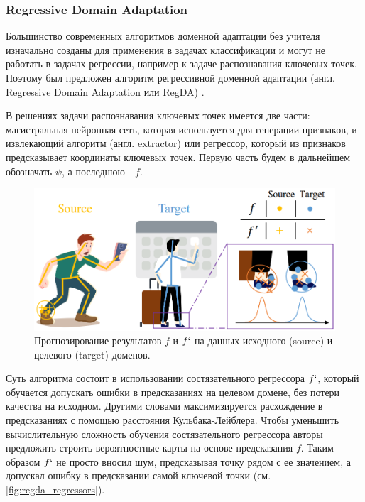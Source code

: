 \subsubsection*{Regressive Domain Adaptation}

Большинство современных алгоритмов доменной адаптации без учителя изначально созданы для применения в задачах классификации и могут не работать в задачах регрессии, например к задаче распознавания ключевых точек. Поэтому был предложен алгоритм регрессивной доменной адаптации (англ. Regressive Domain Adaptation или RegDA) \cite{regda}.

В решениях задачи распознавания ключевых точек имеется две части: магистральная нейронная сеть, которая используется для генерации признаков, и извлекающий алгоритм (англ. extractor) или регрессор, который из признаков предсказывает координаты ключевых точек. Первую часть будем в дальнейшем обозначать $\psi$, а последнюю - $f$.

\begin{figure}[h]
	\centering
	\includegraphics[width=.8\textwidth]{./images/regda_regressors}
	\caption{Прогнозирование результатов $f$ и $f`$ на данных исходного (source) и целевого (target) доменов. \cite{regda}}
	\label{fig:regda_regressors}
\end{figure}

Суть алгоритма состоит в использовании состязательного регрессора $f`$, который обучается допускать ошибки в предсказаниях на целевом домене, без потери качества на исходном. Другими словами максимизируется расхождение в предсказаниях с помощью расстояния Кульбака-Лейблера. Чтобы уменьшить вычислительную сложность обучения состязательного регрессора авторы предложить строить вероятностные карты на основе предсказания $f$. Таким образом $f`$ не просто вносил шум, предсказывая точку рядом с ее значением, а допускал ошибку в предсказании самой ключевой точки (см. \autoref{fig:regda_regressors}).

